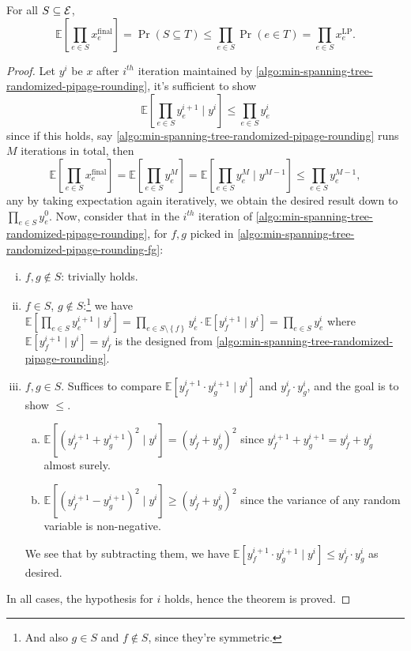 \begin{theorem}\label{thm:negative-correlation}
	For all \(S \subseteq \mathcal{\MakeUppercase{e}} \),
	\[
		\mathbb{E}\left[\prod_{e\in S} x^{\text{final} }_e \right] = \Pr(S \subseteq T) \leq \prod_{e\in S} \Pr(e\in T) = \prod_{e\in S} x^{\text{LP} }_e.
	\]
\end{theorem}
\begin{proof}
	Let \(y^i\) be \(x\) after \(i^{th} \) iteration maintained by \autoref{algo:min-spanning-tree-randomized-pipage-rounding}, it's sufficient to show
	\[
		\mathbb{E}\left[\prod\limits_{e\in S} y^{i+1}_e \mid y^i\right] \leq \prod\limits_{e\in S} y^i_e
	\]
	since if this holds, say \autoref{algo:min-spanning-tree-randomized-pipage-rounding} runs \(M\) iterations in total, then
	\[
		\mathbb{E}\left[\prod\limits_{e\in S} x_e^{\text{final} } \right]
		= \mathbb{E}\left[\prod\limits_{e\in S} y_e^{M} \right]
		= \mathbb{E}\left[\prod\limits_{e\in S} y_e^{M} \mid y^{M-1} \right]
		\leq \prod\limits_{e\in S} y_e^{M-1},
	\]
	any by taking expectation again iteratively, we obtain the desired result down to \(\prod_{e\in S} y^0_e\). Now, consider that in the \(i^{th} \) iteration of \autoref{algo:min-spanning-tree-randomized-pipage-rounding}, for \(f, g\) picked in \autoref{algo:min-spanning-tree-randomized-pipage-rounding-fg}:
	\begin{enumerate}[(i)]
		\item \(f, g \notin S\): trivially holds.
		\item \(f\in S\), \(g \notin S\):\footnote{And also \(g\in S\) and \(f \notin S\), since they're symmetric.} we have \(\mathbb{E}\left[\prod_{e\in S} y^{i+1}_e \mid y^i\right] = \prod_{e\in S\setminus \left\{ f \right\} } y_e^i \cdot \mathbb{E}\left[y_f^{i+1} \mid y^i\right] = \prod_{e\in S} y_e^i\) where \(\mathbb{E}\left[y_f^{i+1} \mid y^i\right] = y^i_f\) is the designed from \autoref{algo:min-spanning-tree-randomized-pipage-rounding}.
		\item \(f, g\in S\). Suffices to compare \(\mathbb{E}\left[y_f^{i+1} \cdot y_g^{i+1} \mid y^i \right] \) and \(y_f^i \cdot y_g^i\), and the goal is to show \(\leq \).
		      \begin{enumerate}[(a)]
			      \item \(\mathbb{E}\left[(y_f^{i+1} + y_g^{i+1})^{2} \mid y^i \right] = (y_f^i + y_g^i)^{2} \) since \(y_f^{i+1} + y_g^{i+1} = y_f^i + y_g^i\) almost surely.
			      \item \(\mathbb{E}\left[(y_f^{i+1} - y_g^{i+1})^{2} \mid y^i \right] \geq (y_f^i + y_g^i)^{2} \) since the variance of any random variable is non-negative.
		      \end{enumerate}
		      We see that by subtracting them, we have \(\mathbb{E}\left[y_f^{i+1}\cdot y_g^{i+1} \mid y^i\right] \leq y_f^i\cdot y_g^i\) as desired.
	\end{enumerate}
	In all cases, the hypothesis for \(i\) holds, hence the theorem is proved.
\end{proof}